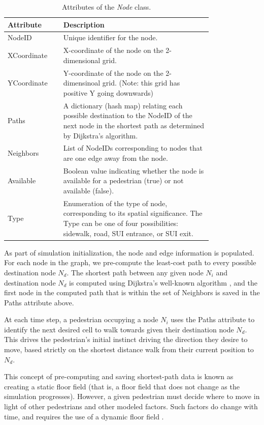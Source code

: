 \documentclass[12pt]{article}
\begin{document}
\def\arraystretch{1.5}
\begin{table}[hb!]
  \centering
    \begin{tabular}{p{0.2\linewidth}p{0.6\linewidth}}
     \hline
     Attribute & Description \\
     \hline
     NodeID      & Unique identifier for the node. \\
     XCoordinate & X-coordinate of the node on the 2-dimensional grid. \\
     YCoordinate & Y-coordinate of the node on the 2-dimensinoal grid. (Note: this grid has positive Y going downwards) \\
     Paths       & A dictionary (hash map) relating each possible destination
                   to the NodeID of the next node in the shortest path as
                   determined by Dijkstra's algorithm. \\
     Neighbors & List of NodeIDs corresponding to nodes that are one edge away from the node. \\
     Available	& Boolean value indicating whether the node is available for a pedestrian (true) or not available (false). \\
     Type      & Enumeration of the type of node, corresponding to its spatial significance. The Type can be one of four possibilities: sidewalk, road, SUI entrance, or SUI exit. \\
     \hline
    \end{tabular}
    \caption{Attributes of the \textit{Node} class.}
  \label{table:node}
\end{table}

As part of simulation initialization, the node and edge information is populated.  For each node in the graph, we pre-compute the least-cost path to every possible
destination node $N_d$. The shortest path between any
given node $N_i$ and destination node $N_d$ is computed using Dijkstra's well-known
algorithm \cite{dijkstra1959note}, and the first node in the computed path that is within the set of Neighbors is saved in the Paths attribute above.

At each time step, a pedestrian occupying a node $N_i$ uses the Paths attribute to identify the next desired cell to walk towards given their destination node $N_d$. This drives the pedestrian’s initial instinct driving the direction they desire to move, based strictly on the shortest distance walk from their current position to $N_d$.

This concept of pre-computing and saving shortest-path data is known as creating a static floor field (that is, a floor field that does not change as the simulation progresses).  However, a given pedestrian must decide where to move in light of other pedestrians and other modeled factors. Such factors do change with time, and requires the use of a dynamic floor field \cite{burstedde2001simulation}.
\end{document}
